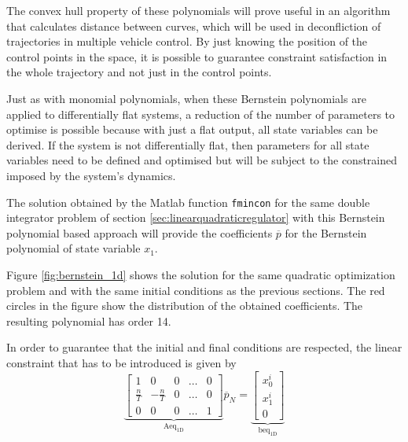 
The convex hull property of these polynomials will prove useful in an algorithm that calculates distance between curves, which will be used in deconfliction of trajectories in multiple vehicle control. By just knowing the position of the control points in the space, it is possible to guarantee constraint satisfaction in the whole trajectory and not just in the control points.

\par Just as with monomial polynomials, when these Bernstein polynomials are applied to differentially flat systems, a reduction of the number of parameters to optimise is possible because with just a flat output, all state variables can be derived. If the system is not differentially flat, then parameters for all state variables need to be defined and optimised but will be subject to the constrained imposed by the system's dynamics.

\par The solution obtained by the Matlab function \texttt{fmincon} for the same double integrator problem of section \ref{sec:linearquadraticregulator} with this Bernstein polynomial based approach will provide the coefficients $\overline{p}$ for the Bernstein polynomial of state variable $x_1$. 

\par Figure \ref{fig:bernstein_1d} shows the solution for the same quadratic optimization problem and with the same initial conditions as the previous sections. The red circles in the figure show the distribution of the obtained coefficients. The resulting polynomial has order 14.

\par In order to guarantee that the initial and final conditions are respected, the linear constraint that has to be introduced is given by
\begin{equation}
    \label{eq:bern_equality}
    \underbrace{\begin{bmatrix}
        1 & 0 & 0 & \dots & 0 \\
        \frac{n}{T} & -\frac{n}{T} & 0 & \dots & 0 \\
        0 & 0 & 0 & \dots & 1 \end{bmatrix}}_{\text{Aeq}_{\text{1D}}} \overline{p}_N =
    \underbrace{\begin{bmatrix}
        x_0^i \\ x_1^i \\ 0\end{bmatrix}}_{\text{beq}_{\text{1D}}}
\end{equation}


